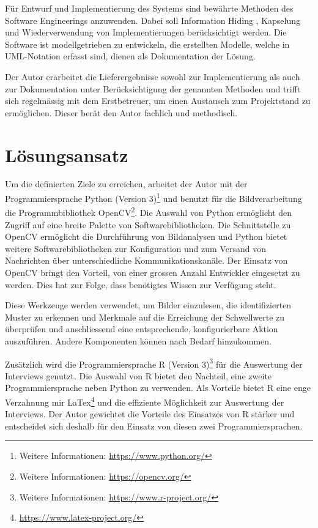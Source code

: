 Für Entwurf und Implementierung des Systems sind bewährte Methoden des Software Engineerings anzuwenden. Dabei soll Information Hiding \citep[S. 764]{Sommerville2016}, Kapselung \citep[S. 150]{Deck2010} und Wiederverwendung von Implementierungen \citep[S. 140]{Deck2010} berücksichtigt werden. Die Software ist modellgetrieben zu entwickeln, die erstellten Modelle, welche in UML-Notation erfasst sind, dienen als Dokumentation der Lösung.

Der Autor erarbeitet die Lieferergebnisse sowohl zur Implementierung als auch zur Dokumentation unter Berücksichtigung der genannten Methoden und trifft sich regelmässig mit dem Erstbetreuer, um einen Austausch zum Projektstand zu ermöglichen. Dieser berät den Autor fachlich und methodisch.

\section{Lösungsansatz}

Um die definierten Ziele zu erreichen, arbeitet der Autor mit der Programmiersprache Python (Version 3)\footnote{Weitere Informationen: \url{https://www.python.org/}} und benutzt für die Bildverarbeitung die Programmbibliothek OpenCV\footnote{Weitere Informationen: \url{https://opencv.org/}}. Die Auswahl von Python ermöglicht den Zugriff auf eine breite Palette von Softwarebibliotheken. Die Schnittstelle zu OpenCV ermöglicht die Durchführung von Bildanalysen und Python bietet weitere Softwarebibliotheken zur Konfiguration und zum Versand von Nachrichten über unterschiedliche Kommunikationskanäle. Der Einsatz von OpenCV bringt den Vorteil, von einer grossen Anzahl Entwickler eingesetzt zu werden. Dies hat zur Folge, dass benötigtes Wissen zur Verfügung steht. 

Diese Werkzeuge werden verwendet, um Bilder einzulesen, die identifizierten Muster zu erkennen und Merkmale auf die Erreichung der Schwellwerte zu überprüfen und anschliessend eine entsprechende, konfigurierbare Aktion auszuführen. Andere Komponenten können nach Bedarf hinzukommen.

Zusätzlich wird die Programmiersprache R (Version 3)\footnote{Weitere Informationen: \url{https://www.r-project.org/}} für die Auswertung der Interviews genutzt. Die Auswahl von R bietet den Nachteil, eine zweite Programmiersprache neben Python zu verwenden. Als Vorteile bietet R eine enge Verzahnung mir LaTex\footnote{\url{https://www.latex-project.org/}} und die effiziente Möglichkeit zur Auswertung der Interviews. Der Autor gewichtet die Vorteile des Einsatzes von R stärker und entscheidet sich deshalb für den Einsatz von diesen zwei Programmiersprachen.

